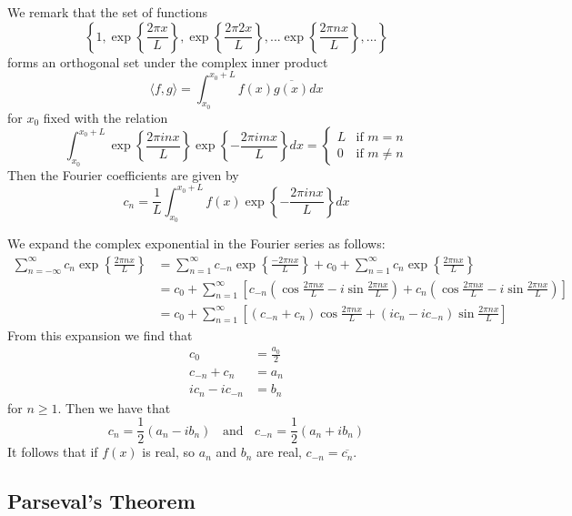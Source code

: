 \documentclass[12pt, a4paper, oneside, openright, titlepage]{book}
\begin{document}
We remark that the set of functions $$\left\{1,\exp\left\{\frac{2\pi x}{L}\right\},\exp\left\{\frac{2\pi 2x}{L}\right\},...\exp\left\{\frac{2\pi nx}{L}\right\},...\right\}$$
forms an orthogonal set under the complex inner product \begin{equation*}
    \langle f, g\rangle = \int_{x_0}^{x_0+L}f(x)\overline{g(x)}dx
\end{equation*}
for $x_0$ fixed with the relation \begin{equation*}
    \int_{x_0}^{x_0+L}\exp\left\{\frac{2\pi inx}{L}\right\}\exp\left\{-\frac{2\pi imx}{L}\right\}dx = \left\{\begin{array}{lc} L & \text{if } m = n \\ 0 & \text{if } m \neq n\end{array}\right.
\end{equation*} 
Then the Fourier coefficients are given by \begin{equation}
    c_n = \frac{1}{L}\int_{x_0}^{x_0+L}f(x)\exp\left\{-\frac{2\pi inx}{L}\right\}dx
\end{equation}

We expand the complex exponential in the Fourier series as follows: \begin{align*}
    \sum_{n=-\infty}^{\infty}c_n\exp\left\{\frac{2\pi nx}{L}\right\} &= \sum_{n=1}^{\infty}c_{-n}\exp\left\{\frac{-2\pi nx}{L}\right\} + c_0 + \sum_{n=1}^{\infty}c_n\exp\left\{\frac{2\pi nx}{L}\right\} \\
    &= c_0 + \sum_{n=1}^{\infty}\left[c_{-n}\left(\cos\frac{2\pi nx}{L} - i\sin\frac{2\pi nx}{L}\right) + c_n\left(\cos\frac{2\pi nx}{L} - i\sin\frac{2\pi nx}{L}\right)\right] \\
    &= c_0 + \sum_{n=1}^{\infty}\left[(c_{-n}+c_n)\cos\frac{2\pi nx}{L}+(ic_n - ic_{-n})\sin\frac{2\pi nx}{L}\right]
\end{align*}
From this expansion we find that \begin{align*}
    c_0 &= \frac{a_0}{2} \\
    c_{-n}+c_n &= a_n \\
    ic_n - ic_{-n} &= b_n
\end{align*}
for $n \geq 1$. Then we have that \begin{equation*}
    c_n = \frac{1}{2}(a_n - ib_n) \;\;\text{ and }\;\;c_{-n} = \frac{1}{2}(a_n + ib_n)
\end{equation*}
It follows that if $f(x)$ is real, so $a_n$ and $b_n$ are real, $c_{-n} = \overline{c_n}$.


\subsection{Parseval's Theorem}
\end{document}
